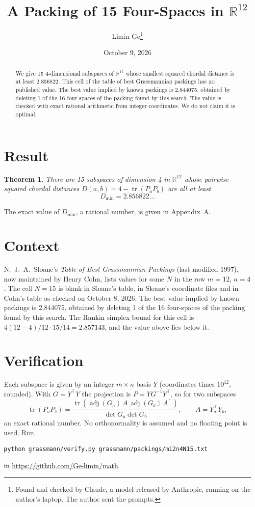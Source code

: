 \documentclass[11pt,a4paper]{article}
\title{A Packing of 15 Four-Spaces in $\mathbb{R}^{12}$}
\author{Limin Ge\thanks{Found and checked by Claude, a model released by Anthropic, running on the author's laptop. The author sent the prompts.}}
\date{October 9, 2026}
\newtheorem*{theorem}{Theorem}
\begin{document}
\maketitle
\begin{abstract}
We give 15 4-dimensional subspaces of $\mathbb{R}^{12}$ whose smallest squared chordal distance is at least 2.856822. This cell of the table of best Grassmannian packings has no published value. The best value implied by known packings is 2.844075, obtained by deleting 1 of the 16 four-spaces of the packing found by this search. The value is checked with exact rational arithmetic from integer coordinates. We do not claim it is optimal.
\end{abstract}

\section{Result}
\begin{theorem}
There are 15 subspaces of dimension 4 in $\mathbb{R}^{12}$ whose pairwise squared chordal distances $D(a,b) = 4 - \operatorname{tr}(P_aP_b)$ are all at least
\[ D_{\min} = 2.856822\ldots \]
\end{theorem}
The exact value of $D_{\min}$, a rational number, is given in Appendix~A.


\section{Context}
N.~J.~A.~Sloane's \emph{Table of Best Grassmannian Packings} (last modified 1997), now maintained by Henry Cohn, lists values for some $N$ in the row $m=12$, $n=4$. The cell $N=15$ is blank in Sloane's table, in Sloane's coordinate files and in Cohn's table as checked on October 8, 2026. The best value implied by known packings is 2.844075, obtained by deleting 1 of the 16 four-spaces of the packing found by this search. The Rankin simplex bound for this cell is $4(12-4)/12\cdot 15/14 = 2.857143$, and the value above lies below it.


\section{Verification}
Each subspace is given by an integer $m\times n$ basis $Y$ (coordinates times $10^{12}$, rounded). With $G=Y^\top Y$ the projection is $P=YG^{-1}Y^\top$, so for two subspaces
\[ \operatorname{tr}(P_aP_b)=\frac{\operatorname{tr}(\operatorname{adj}(G_a)\,A\,\operatorname{adj}(G_b)\,A^\top)}{\det G_a\det G_b},\qquad A=Y_a^\top Y_b, \]
an exact rational number. No orthonormality is assumed and no floating point is used. Run
\begin{verbatim}
python grassmann/verify.py grassmann/packings/m12n4N15.txt
\end{verbatim}
in \url{https://github.com/Ge-limin/math}.
\end{document}

